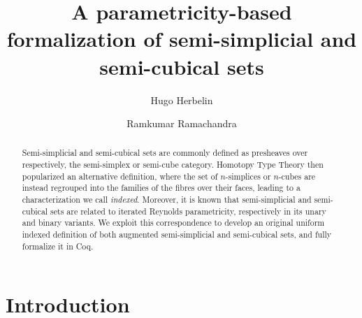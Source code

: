 \documentclass{msc}
\begin{document}
\title{A parametricity-based formalization of semi-simplicial and semi-cubical sets}
\begin{authgrp}
  \author{Hugo Herbelin}
  \author{Ramkumar Ramachandra}
\end{authgrp}
\begin{abstract}
  Semi-simplicial and semi-cubical sets are commonly defined as presheaves over respectively, the semi-simplex or semi-cube category. Homotopy Type Theory then popularized an alternative definition, where the set of $n$-simplices or $n$-cubes are instead regrouped into the families of the fibres over their faces, leading to a characterization we call \emph{indexed}. Moreover, it is known that semi-simplicial and semi-cubical sets are related to iterated Reynolds parametricity, respectively in its unary and binary variants. We exploit this correspondence to develop an original uniform indexed definition of both augmented semi-simplicial and semi-cubical sets, and fully formalize it in Coq.
\end{abstract}
\maketitle
\vspace{-2em} %

\section{Introduction}
\end{document}
